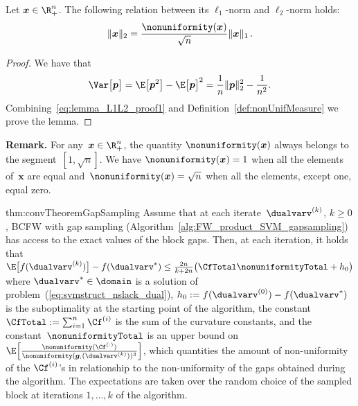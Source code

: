 \documentclass{article}
\begin{document}
\begin{lemma}
    \label{lemma:L1L2}
    Let $\bm{x}\in\R^n_+$.
    The following relation between its $\ell_1$-norm and $\ell_2$-norm holds:
    \begin{equation*}
    \Vert \bm{x} \Vert_2 =  \frac{\nonuniformity(\bm{x})}{\sqrt{n}}\Vert \bm{x} \Vert_1 \, .
    \end{equation*}
\end{lemma}
\begin{proof}
    We have that\\[-0.2cm]
    \begin{equation}
    \label{eq:lemma_L1L2_proof1}
    \Var \big[\bm{p}\big] = \E \big[ \bm{p}^2 \big] - \E \big[ \bm{p} \big]^2 = \frac{1}{n} \| \bm{p} \|_2^2 - \frac{1}{n^2}.
    \end{equation}
    Combining~\eqref{eq:lemma_L1L2_proof1} and Definition~\ref{def:nonUnifMeasure} we prove the lemma.
\end{proof}


\textbf{Remark.} For any~$\bm{x} \in \R^n_+$, the quantity $\nonuniformity(\bm{x})$ always belongs to the segment~$[1,\sqrt{n}]$. 
We have $\nonuniformity(\bm{x})=1$ when all the elements of~$\bm{x}$ are equal and~$\nonuniformity(\bm{x})=\sqrt{n}$ when all the elements, except one, equal zero.
%

\begin{reptheorem}{thm:convTheoremGapSampling}
    Assume that at each iterate~$\dualvarv^{(k)}$, $k\ge 0$, BCFW with gap sampling (Algorithm~\ref{alg:FW_product_SVM_gapsampling}) has access to the exact values of the block gaps. 
    Then, at each iteration, it holds that
    $
    \E \big[f(\dualvarv^{(k)})\big] - f(\dualvarv^*) \le \frac{2n}{k+2n}\big(\CfTotal \nonuniformityTotal + h_0\big)
    $
    where $\dualvarv^*\in \domain$ is a solution of problem~(\ref{eq:svmstruct_nslack_dual}), $h_0 := f(\dualvarv^{(0)}) - f(\dualvarv^*)$ is the suboptimality at the starting point of the algorithm, the constant~$\CfTotal := \sum_{i=1}^n \Cf^{(i)}$ is the sum of the curvature constants, and the constant~$\nonuniformityTotal$ is an upper bound on $\E \Big[ \frac{\nonuniformity(\Cf^{(:)})}{\nonuniformity(\bm{g}_{:}(\dualvarv^{(k)}))^3} \Big]$, which quantities the amount of non-uniformity of the $\Cf^{(i)}$'s in relationship to the non-uniformity of the gaps obtained during the algorithm.
    The expectations are taken over the random choice of the sampled block at iterations $1,\dots,k$ of the algorithm.
\end{reptheorem}
\end{document}
